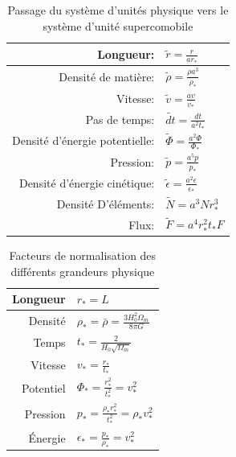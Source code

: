 \begin{table}[htbp]
\begin{center}
\begin{tabular}{r l} \hline 
Longueur: & $\tilde{r}=\frac{r}{ar_*}$ \\ \hline 
Densité de matière: & $\tilde{\rho}=\frac{\rho a^3}{\rho_*}$ \\ \hline 
Vitesse: & $ \tilde{v}=\frac{av}{v_*}$ \\ \hline 
Pas de temps: & $\tilde{dt}=\frac{dt}{a^2t_*}$\\ \hline 
Densité d’énergie potentielle: & $\tilde{\Phi}=\frac{a^2 \Phi}{\Phi_*}$\\ \hline 
Pression: & $\tilde{p}=\frac{a^5 p}{p_*}$\\ \hline 
Densité d’énergie cinétique: & $\tilde{\epsilon}=\frac{a^2 \epsilon}{\epsilon_*}$\\ \hline 
Densité D’éléments: & $\tilde{N}=a^3 N r_*^3$\\ \hline 
Flux: & $\tilde{F}=a^4 r_*^2 t_* F$\\ \hline 
\end{tabular} 
\end{center}
\caption{Passage du système d'unités physique vers le système d'unité supercomobile} 
\end{table}

\begin{table}[htbp]
\begin{center}
\begin{tabular}{r l} \hline 
Longueur  & $r_*=L$\\ \hline 
Densité & $\rho_* = \bar{\rho} = \frac{3H_0^2 \Omega_m}{8\pi G}$\\ \hline 
Temps & $t_* = \frac{2}{H_0 \sqrt{\Omega_m}}$\\ \hline 
Vitesse & $v_* = \frac{r_*}{t_*}$\\ \hline 
Potentiel & $\Phi_* = \frac{r_*^2}{t_*^2} = v_*^2$\\ \hline 
Pression & $p_* = \frac{\rho_* r_*^2}{t_*^2} = \rho_* v_*^2$\\ \hline 
Énergie & $\epsilon_* = \frac{p_*}{\rho_*} = v_*^2$\\ \hline 
\end{tabular} 
\end{center}

\caption{Facteurs de normalisation des différents grandeurs physique} 
\end{table}




